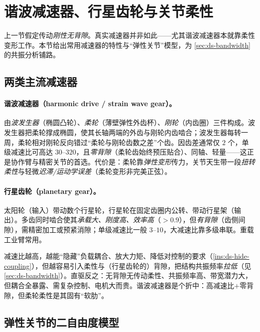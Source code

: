 \section{谐波减速器、行星齿轮与关节柔性}
\label{sec:ds-flex}

上一节假定传动\emph{刚性无背隙}。真实减速器并非如此——尤其谐波减速器本就靠柔性变形工作。本节给出常用减速器的特性与“弹性关节”模型，为 \cref{sec:ds-bandwidth} 的共振分析铺路。

\subsection{两类主流减速器}
\label{sec:ds-reducers}

\paragraph{谐波减速器（harmonic drive / strain wave gear）。}\;由\emph{波发生器}（椭圆凸轮）、\emph{柔轮}（薄壁弹性外齿杯）、\emph{刚轮}（内齿圈）三件构成。波发生器把柔轮撑成椭圆，使其长轴两端的外齿与刚轮内齿啮合；波发生器每转一周，柔轮相对刚轮反向错过“柔轮与刚轮齿数之差”个齿。因齿差通常仅 $2$ 个，单级减速比可高达 $30$--$320$，且\emph{零背隙}（柔轮齿始终预压贴合）、同轴、轻量——这正是协作臂与精密关节的首选。代价是：柔轮靠\emph{弹性变形}传力，关节天生带一段\emph{扭转柔性}与轻微\emph{迟滞/运动学误差}（柔轮变形非完美正弦）。

\paragraph{行星齿轮（planetary gear）。}\;太阳轮（输入）带动数个行星轮，行星轮在固定齿圈内公转、带动行星架（输出）。多齿同时啮合使其\emph{承载大、刚度高、效率高}（$>0.9$），但\emph{有背隙}（齿侧间隙），需精密加工或预紧消隙；单级减速比一般 $3$--$10$，大减速比靠多级串联。重载工业臂常用。

\begin{note}
减速比越高，越能“隐藏”负载耦合、放大力矩、降低对控制的要求（\cref{ins:ds-hide-coupling}），但越容易引入柔性与（行星齿轮的）背隙，把结构共振频率\emph{拉低}（见 \cref{sec:ds-bandwidth}）。直驱反之：无背隙无传动柔性、共振频率高、带宽潜力大，但耦合全暴露、需复杂控制、电机大而贵。谐波减速器是个折中：高减速比$+$零背隙，但柔轮柔性是其固有“软肋”。
\end{note}

\subsection{弹性关节的二自由度模型}
\label{sec:ds-elasticjoint}

